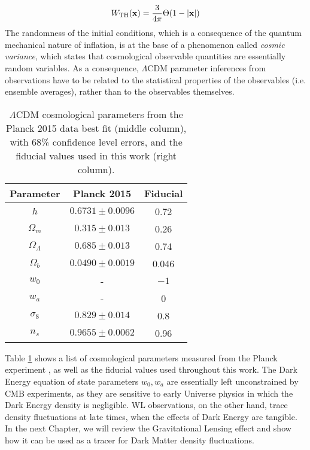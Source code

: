 \begin{equation}
\label{eq:1:tophat}
W_{\rm TH}(\mathbf{x}) = \frac{3}{4\pi}\Theta(1-\vert\mathbf{x}\vert)
\end{equation}
%
The randomness of the initial conditions, which is a consequence of the quantum mechanical nature of inflation, is at the base of a phenomenon called \textit{cosmic variance}, which states that cosmological observable quantities are essentially random variables. As a consequence, $\Lambda$CDM parameter inferences from observations have to be related to the statistical properties of the observables (i.e. ensemble averages), rather than to the observables themselves. 
%
\begin{table}
\begin{center}
\begin{tabular}[h]{c|c|c}

\textbf{Parameter} & \textbf{Planck 2015} & \textbf{Fiducial} \\ \hline 

$h$ & $0.6731\pm 0.0096$ & 0.72 \\
$\Omega_m$ & $0.315\pm 0.013$ & 0.26 \\
$\Omega_\Lambda$ & $0.685\pm 0.013$ & 0.74 \\
$\Omega_b$ & $0.0490\pm 0.0019$ & 0.046 \\
$w_0$ & - & $-1$ \\
$w_a$ & - & 0 \\
$\sigma_8$ & $0.829\pm0.014$ & 0.8 \\
$n_s$ & $0.9655\pm 0.0062$ & 0.96 \\

\end{tabular}
\end{center}
\caption{$\Lambda$CDM cosmological parameters from the Planck 2015 \citep{Planck15} data best fit (middle column), with 68\% confidence level errors, and the fiducial values used in this work (right column).}
\label{tab:1:cosmopar}
\end{table}
%
Table \ref{tab:1:cosmopar} shows a list of cosmological parameters measured from the Planck experiment \citep{Planck15}, as well as the fiducial values used throughout this work. The Dark Energy equation of state parameters $w_0,w_a$ are essentially left unconstrained by CMB experiments, as they are sensitive to early Universe physics in which the Dark Energy density is negligible. WL observations, on the other hand, trace density fluctuations at late times, when the effects of Dark Energy are tangible. In the next Chapter, we will review the Gravitational Lensing effect and show how it can be used as a tracer for Dark Matter density fluctuations. 

%